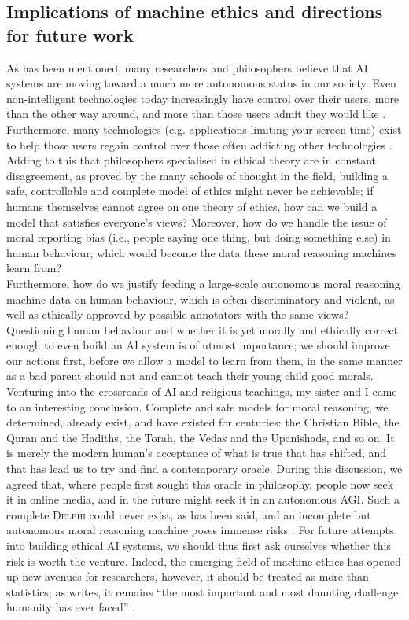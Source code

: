 \documentclass[final]{clv3} %
\begin{document}
\subsection{Implications of machine ethics and directions for future work
}

As has been mentioned, many researchers and philosophers believe \cite{allen2005, tegmark} that AI systems are moving toward a much more autonomous status in our society. Even non-intelligent technologies today increasingly have control over their users, more than the other way around, and more than those users admit they would like \cite{ryan}. Furthermore, many technologies (e.g. applications limiting your screen time) exist to help those users regain control over those often addicting other technologies \cite{winkelman}. Adding to this that philosophers specialised in ethical theory are in constant disagreement, as proved by the many schools of thought in the field, building a safe, controllable and complete model of ethics might never be achievable; if humans themselves cannot agree on one theory of ethics, how can we build a model that satisfies everyone’s views? Moreover, how do we handle the issue of moral reporting bias (i.e., people saying one thing, but doing something else) in human behaviour, which would become the data these moral reasoning machines learn from?\\

Furthermore, how do we justify feeding a large-scale autonomous moral reasoning machine data on human behaviour, which is often discriminatory and violent, as well as ethically approved by possible annotators with the same views? Questioning human behaviour and whether it is yet morally and ethically correct enough to even build an AI system is of utmost importance; we should improve our actions first, before we allow a model to learn from them, in the same manner as a bad parent should not and cannot teach their young child good morals.\\

Venturing into the crossroads of AI and religious teachings, my sister and I came to an interesting conclusion. Complete and safe models for moral reasoning, we determined, already exist, and have existed for centuries: the Christian Bible, the Quran and the Hadiths, the Torah, the Vedas and the Upanishads, and so on. It is merely the modern human’s acceptance of what is true that has shifted, and that has lead us to try and find a contemporary oracle. During this discussion, we agreed that, where people first sought this oracle in philosophy, people now seek it in online media, and in the future might seek it in an autonomous AGI. Such a complete \textsc{Delphi} could never exist, as has been said, and an incomplete but autonomous moral reasoning machine poses immense risks \cite{tegmark}. For future attempts into building ethical AI systems, we should thus first ask ourselves whether this risk is worth the venture. Indeed, the emerging field of machine ethics has opened up new avenues for researchers, however, it should be treated as more than statistics; as \citet{bostrom} writes, it remains “the most important and most daunting challenge humanity has ever faced” \cite[vii]{bostrom}.\\
\newpage
\end{document}
